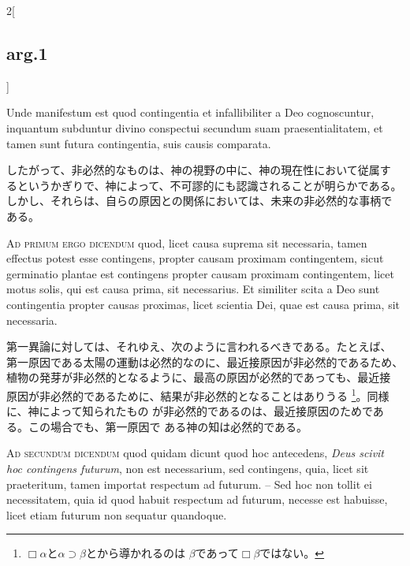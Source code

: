 \documentclass[paper=a4paper,fontsize=10pt,jafontsize=9pt,titlepage]{jlreq}
\begin{document}
\begin{paracol}{2}[\subsection{arg.1}]
\switchcolumn*

Unde manifestum est quod contingentia et infallibiliter a Deo
cognoscuntur, inquantum subduntur divino conspectui secundum suam
praesentialitatem, et tamen sunt futura contingentia, suis causis
comparata.

\switchcolumn

したがって、非必然的なものは、神の視野の中に、神の現在性において従属す
るというかぎりで、神によって、不可謬的にも認識されることが明らかである。
しかし、それらは、自らの原因との関係においては、未来の非必然的な事柄で
ある。

\switchcolumn*[\subsection{ad.1}]

{\scshape Ad primum ergo dicendum} quod, licet causa suprema sit
necessaria, tamen effectus potest esse contingens, propter causam
proximam contingentem, sicut germinatio plantae est contingens propter
causam proximam contingentem, licet motus solis, qui est causa prima,
sit necessarius. Et similiter scita a Deo sunt contingentia propter
causas proximas, licet scientia Dei, quae est causa prima, sit
necessaria.

\switchcolumn

第一異論に対しては、それゆえ、次のように言われるべきである。たとえば、
第一原因である太陽の運動は必然的なのに、最近接原因が非必然的であるため、
植物の発芽が非必然的となるように、最高の原因が必然的であっても、最近接
原因が非必然的であるために、結果が非必然的となることはありうる
\footnote{$\Box \alpha$と$\alpha \supset \beta$とから導かれるのは
$\beta$であって$\Box \beta$ではない。}。同様に、神によって知られたもの
が非必然的であるのは、最近接原因のためである。この場合でも、第一原因で
ある神の知は必然的である。

\switchcolumn*[\subsection{ad.2}]

{\scshape Ad secundum dicendum} quod quidam dicunt quod hoc
antecedens, {\itshape Deus scivit hoc contingens futurum}, non est
necessarium, sed contingens, quia, licet sit praeteritum, tamen
importat respectum ad futurum. -- Sed hoc non tollit ei necessitatem,
quia id quod habuit respectum ad futurum, necesse est habuisse, licet
etiam futurum non sequatur quandoque.

\switchcolumn


\end{paracol}
\end{document}
